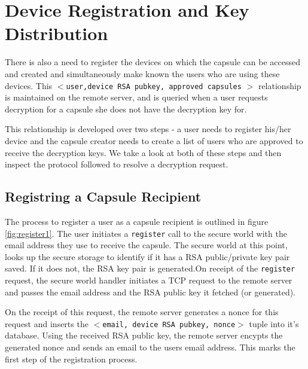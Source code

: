 \chapter{Device Registration and Key Distribution}
\label{ch:device_key_reg}
There is also a need to register the devices on which the capsule can be
accessed and created and simultaneously make known the users who are using these
devices. This $<$\texttt{user,device RSA pubkey, approved capsules} $>$ relationship is
maintained on the remote server, and is queried when a user
requests decryption for a capsule she does not have the decryption key for.

This relationship is developed over two steps - a user needs to register
his/her device and the capsule creator needs to create a list of users who are
approved to receive the decryption keys. We take a look at both of these steps
and then inspect the protocol followed to resolve a decryption request.  

\section{Registring a Capsule Recipient}
The process to register a user as a capsule recipient is outlined in figure
\ref{fig:register1}. The user initiates a \texttt{register} call to the secure
world with the email address they use to receive the capsule. The secure world
at this point, looks up the secure storage to identify if it has a RSA
public/private key pair saved. If it does not, the RSA key pair is generated.On
receipt of the \texttt{register} request, the secure world handler initiates a
TCP request to the remote server and passes the email address and the RSA public
key it fetched (or generated). 

On the receipt of this request, the remote server generates a nonce for this
request and inserts the $<$\texttt{email, device RSA pubkey, nonce}$>$ tuple
into it's database. Using the received RSA public key, the remote server encypts
the generated nonce and sends an email to the users email address. This marks
the first step of the registration process.


